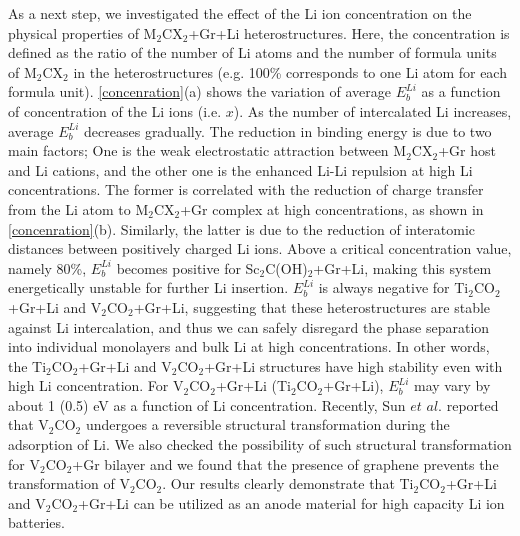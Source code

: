 As a next step, we investigated the effect of the Li ion concentration on the physical properties of M$_2$CX$_2$+Gr+Li heterostructures. Here, the concentration is defined as the ratio of the number of Li atoms and the number of formula units of M$_2$CX$_2$ in the heterostructures (e.g. 100\% corresponds to one Li atom for each formula unit). \autoref{concenration}(a) shows the variation of average $E_{b}^{Li}$ as a function of concentration of the Li ions (i.e. $x$). As the number of intercalated Li increases,  average $E_{b}^{Li}$ decreases gradually. The reduction in binding energy is due to two main factors; One is the weak electrostatic attraction between M$_2$CX$_2$+Gr host and Li cations, and the other one is the enhanced Li-Li repulsion at high Li concentrations. The former is correlated with the reduction of charge transfer from the Li atom to M$_2$CX$_2$+Gr complex at high concentrations, as shown in \autoref{concenration}(b). Similarly, the latter is due to the reduction of interatomic distances between positively charged Li ions. Above a critical concentration value, namely 80\%,  $E_{b}^{Li}$ becomes positive for Sc$_2$C(OH)$_2$+Gr+Li, making this system energetically unstable for further Li insertion.  $E_{b}^{Li}$ is always negative for Ti$_2$CO$_2$+Gr+Li and V$_2$CO$_2$+Gr+Li, suggesting that these heterostructures are stable against Li intercalation, and thus we can safely disregard the phase separation into individual monolayers and bulk Li at high concentrations. In other words, the Ti$_2$CO$_2$+Gr+Li and V$_2$CO$_2$+Gr+Li structures have high stability even with high Li concentration. For V$_2$CO$_2$+Gr+Li (Ti$_2$CO$_2$+Gr+Li), $E_{b}^{Li}$ may vary by about 1 (0.5) eV as a function of Li concentration. Recently, Sun $et$ $al.$ \citet{doi:10.1021/acsami.5b03863}reported that V$_2$CO$_2$ undergoes a reversible structural transformation during the adsorption of Li. We also checked the possibility of such structural transformation for V$_2$CO$_2$+Gr bilayer and we found that the presence of graphene prevents the transformation of V$_2$CO$_2$. Our results clearly demonstrate that Ti$_2$CO$_2$+Gr+Li and V$_2$CO$_2$+Gr+Li can be utilized as an anode material for high capacity Li ion batteries.


